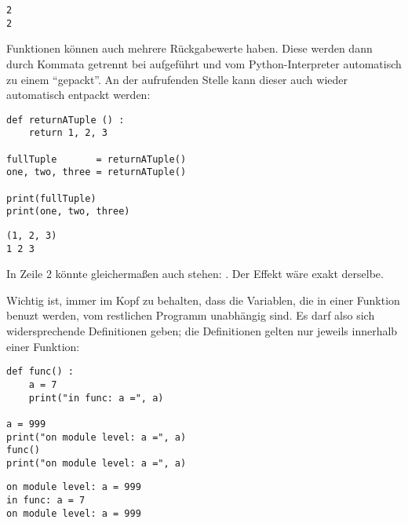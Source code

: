 \begin{cmdbox}
\begin{verbatim}
2
2
\end{verbatim}
\end{cmdbox}

Funktionen können auch mehrere Rückgabewerte haben. Diese werden dann durch Kommata getrennt bei  aufgeführt und vom Python-Interpreter automatisch zu einem  \enquote{gepackt}. An der aufrufenden Stelle kann dieser  auch wieder automatisch entpackt werden:
\begin{codebox}
\begin{verbatim}
def returnATuple () :
    return 1, 2, 3

fullTuple       = returnATuple()
one, two, three = returnATuple()

print(fullTuple)
print(one, two, three)
\end{verbatim}
\end{codebox}

\begin{cmdbox}
\begin{verbatim}
(1, 2, 3)
1 2 3
\end{verbatim}
\end{cmdbox}

In Zeile 2 könnte gleichermaßen auch stehen: . Der Effekt wäre exakt derselbe.

Wichtig ist, immer im Kopf zu behalten, dass die Variablen, die in einer Funktion benuzt werden, vom restlichen Programm unabhängig sind. Es darf also sich widersprechende Definitionen geben; die Definitionen gelten nur jeweils innerhalb einer Funktion:

\begin{codebox}
\begin{verbatim}
def func() :
    a = 7
    print("in func: a =", a)

a = 999
print("on module level: a =", a)
func()
print("on module level: a =", a)
\end{verbatim}
\end{codebox}

\begin{cmdbox}
\begin{verbatim}
on module level: a = 999
in func: a = 7
on module level: a = 999
\end{verbatim}
\end{cmdbox}

